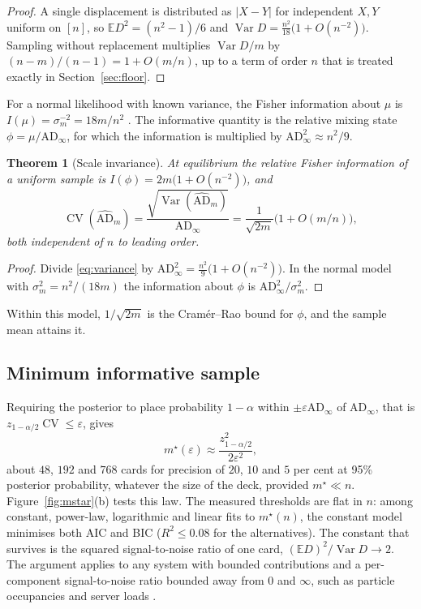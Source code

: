\documentclass[ba]{imsart}
\theoremstyle{plain}
\newtheorem{theorem}{Theorem}[section]
\theoremstyle{definition}
\newcommand{\E}{\mathbb{E}}
\newcommand{\Var}{\operatorname{Var}}
\newcommand{\CV}{\operatorname{CV}}
\newcommand{\AD}{\mathrm{AD}}
\newcommand{\ADh}{\widehat{\mathrm{AD}}}
\begin{document}
\begin{proof}
A single displacement is distributed as $|X-Y|$ for independent $X,Y$ uniform on $[n]$, so $\E D^2=(n^2-1)/6$ and $\Var D=\frac{n^2}{18}\bigl(1+O(n^{-2})\bigr)$. Sampling without replacement multiplies $\Var D/m$ by $(n-m)/(n-1)=1+O(m/n)$, up to a term of order $n$ that is treated exactly in Section~\ref{sec:floor}.
\end{proof}

For a normal likelihood with known variance, the Fisher information about $\mu$ is $I(\mu)=\sigma_m^{-2}=18m/n^2$ \citep{LehmannCasella1998}. The informative quantity is the relative mixing state $\phi=\mu/\AD_\infty$, for which the information is multiplied by $\AD_\infty^2\approx n^2/9$.

\begin{theorem}[Scale invariance]\label{thm:scale}
At equilibrium the relative Fisher information of a uniform sample is $I(\phi)=2m\bigl(1+O(n^{-2})\bigr)$, and
\begin{equation}\label{eq:cv}
\CV(\ADh_m)=\frac{\sqrt{\Var(\ADh_m)}}{\AD_\infty}=\frac{1}{\sqrt{2m}}\bigl(1+O(m/n)\bigr),
\end{equation}
both independent of $n$ to leading order.
\end{theorem}

\begin{proof}
Divide \eqref{eq:variance} by $\AD_\infty^2=\frac{n^2}{9}\bigl(1+O(n^{-2})\bigr)$. In the normal model with $\sigma_m^2=n^2/(18m)$ the information about $\phi$ is $\AD_\infty^2/\sigma_m^2$.
\end{proof}

Within this model, $1/\sqrt{2m}$ is the Cram\'er--Rao bound for $\phi$, and the sample mean attains it.

\subsection{Minimum informative sample}

Requiring the posterior to place probability $1-\alpha$ within $\pm\varepsilon\AD_\infty$ of $\AD_\infty$, that is $z_{1-\alpha/2}\CV\le\varepsilon$, gives
\begin{equation}\label{eq:mstar}
m^\star(\varepsilon)\approx\frac{z_{1-\alpha/2}^2}{2\varepsilon^2},
\end{equation}
about $48$, $192$ and $768$ cards for precision of $20$, $10$ and $5$ per cent at 95\% posterior probability, whatever the size of the deck, provided $m^\star\ll n$. Figure~\ref{fig:mstar}(b) tests this law. The measured thresholds are flat in $n$: among constant, power-law, logarithmic and linear fits to $m^\star(n)$, the constant model minimises both AIC and BIC ($R^2\le0.08$ for the alternatives). The constant that survives is the squared signal-to-noise ratio of one card, $(\E D)^2/\Var D\to2$. The argument applies to any system with bounded contributions and a per-component signal-to-noise ratio bounded away from $0$ and $\infty$, such as particle occupancies \citep{Liggett1985} and server loads \citep{Mitzenmacher2001}.
\end{document}
